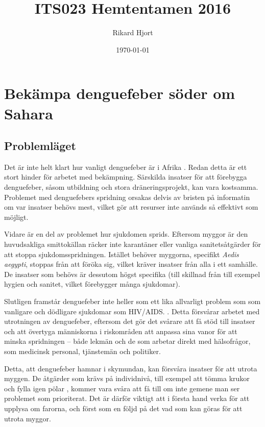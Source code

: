 \documentclass{article}
\title{ITS023 Hemtentamen 2016}
\date{\today}
\author{Rikard Hjort}
\begin{document}
\maketitle

\section{Bekämpa denguefeber söder om Sahara}

\subsection{Problemläget}


Det är inte helt klart hur vanligt denguefeber är i Afrika . Redan detta är ett stort hinder för arbetet med bekämpning. Särskilda insatser för att förebygga denguefeber, såsom utbildning och stora dräneringsprojekt, kan vara kostsamma. Problemet med denguefebers spridning orsakas delvis av bristen på informatin om var insatser behövs mest, vilket gör att resurser inte används så effektivt som möjligt.

Vidare är en del av problemet hur sjukdomen sprids. Eftersom myggor är den huvudsakliga smittokällan  räcker inte karantäner eller vanliga sanitetsåtgärder för att stoppa sjukdomsspridningen. Istället behöver myggorna, specifikt \emph{Aedis aegypti}, stoppas från att föröka sig, vilket kräver insatser från alla i ett samhälle. De insatser som behövs är dessutom högst specifika (till skillnad från till exempel hygien och sanitet, vilket förebygger många sjukdomar).

Slutligen framstår denguefeber inte heller som ett lika allvarligt problem som som vanligare och dödligare sjukdomar som HIV/AIDS. . Detta försvårar arbetet med utrotningen av denguefeber, eftersom det gör det svårare att få stöd till insatser och att övertyga människorna i riskområden att anpassa sina vanor för att minska spridningen – både lekmän och de som arbetar direkt med hälsofrågor, som medicinsk personal, tjänstemän och politiker.

Detta, att denguefeber hamnar i skymundan, kan försvåra insatser för att utrota myggen. De åtgärder som krävs på individnivå, till exempel att tömma krukor och fylla igen pölar , kommer vara svåra att få till om inte gemene man ser problemet som prioriterat. Det är därför viktigt att i första hand verka för att upplysa om farorna, och först som en följd på det vad som kan göras för att utrota myggor.
\end{document}
